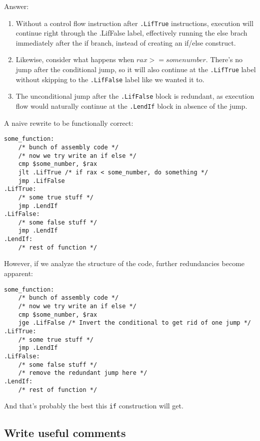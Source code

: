 \documentclass[11pt]{article}
\begin{document}
Answer:

\begin{enumerate}
    \item Without a control flow instruction after \texttt{.LifTrue} instructions,
        execution will continue right through the .LifFalse label, effectively running the
        else brach immediately after the if branch, instead of creating an if/else
        construct.
    \item Likewise, consider what happens when $rax >= some number$. There's no jump after
        the conditional jump, so it will also continue at the \texttt{.LifTrue} label without
        skipping to the \texttt{.LifFalse} label like we wanted it to.
    \item The unconditional jump after the \texttt{.LifFalse} block is redundant, as
        execution flow would naturally continue at the \texttt{.LendIf} block in absence
        of the jump.
\end{enumerate}

A naive rewrite to be functionally correct:

\begin{lstlisting}
some_function:
    /* bunch of assembly code */
    /* now we try write an if else */
    cmp $some_number, $rax
    jlt .LifTrue /* if rax < some_number, do something */
    jmp .LifFalse
.LifTrue:
    /* some true stuff */
    jmp .LendIf
.LifFalse:
    /* some false stuff */
    jmp .LendIf
.LendIf:
    /* rest of function */
\end{lstlisting}

However, if we analyze the structure of the code, further redundancies become apparent:

\begin{lstlisting}
some_function:
    /* bunch of assembly code */
    /* now we try write an if else */
    cmp $some_number, $rax
    jge .LifFalse /* Invert the conditional to get rid of one jump */
.LifTrue:
    /* some true stuff */
    jmp .LendIf
.LifFalse:
    /* some false stuff */
    /* remove the redundant jump here */
.LendIf:
    /* rest of function */
\end{lstlisting}

And that's probably the best this \texttt{if} construction will get.

\subsection{Write useful comments}
\end{document}
